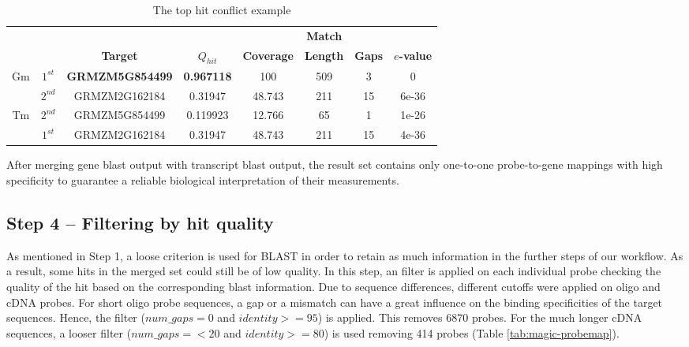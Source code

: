 \begin{table}
	\centering
	\begin{footnotesize}
	\caption{The top hit conflict example} 
	\label{tab:magic-conflict-tops}
	\begin{tabular}{@{}cc|cccccc@{}}
	\toprule
	& & & & & \textbf{Match} & & \\
	& & \textbf{Target} & \textbf{$Q_{hit}$} & \textbf{Coverage} & 
	\textbf{Length} & \textbf{Gaps} & \textbf{$e$-value} \\ 
	\midrule
	Gm &
	$1^{st}$ & \textbf{GRMZM5G854499} & \textbf{0.967118} & 100 & 509 & 3 & 0 \\
	& $2^{nd}$ & GRMZM2G162184 & 0.31947 & 48.743 & 211 & 15 & 6e-36 \\
	\hline
	Tm & 
	$2^{nd}$ & GRMZM5G854499 & 0.119923 & 12.766 & 65 & 1 & 1e-26 \\
	& $1^{st}$ & GRMZM2G162184 & 0.31947 & 48.743 & 211 & 15 & 4e-36 \\
	\bottomrule
	\end{tabular}
	\end{footnotesize}
\end{table}

After merging gene blast output with transcript blast output, the result set 
contains only one-to-one probe-to-gene mappings with high specificity to 
guarantee a reliable biological interpretation of their measurements. 



\subsection{Step 4 – Filtering by hit quality}


As mentioned in Step 1, a loose criterion is used for BLAST in order to retain 
as much information in the further steps of our workflow. 
As a result, some hits in the merged set could still be of low quality. 
In this step, an filter is applied on each individual probe checking the 
quality of the hit based on the corresponding blast information.
Due to sequence differences, different cutoffs were applied on oligo and cDNA 
probes. 
For short oligo probe sequences, a gap or a mismatch can have a great influence 
on the binding specificities of the target sequences. 
Hence, the filter ($num\_gaps = 0$ and $identity >= 95$) is applied. This 
removes 6870 probes. 
For the much longer cDNA sequences, a looser filter ($num\_gaps =< 20$ and 
$identity >= 80$) is used removing 414 probes (Table 
\ref{tab:magic-probemap}). 


